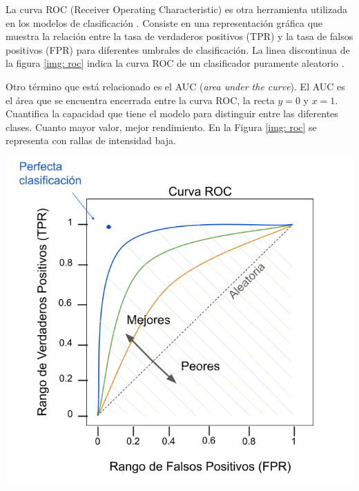 \begin{minipage}{0.5\textwidth}
La curva ROC (Receiver Operating Characteristic) es otra herramienta utilizada en los modelos de clasificación \citep{geron2022hands}. Consiste en una representación gráfica que muestra la relación entre la tasa de verdaderos positivos (TPR) y la tasa de falsos positivos (FPR) para diferentes umbrales de clasificación. La linea discontinua de la figura \ref{img: roc} indica la curva ROC de un clasificador puramente aleatorio \citep{geron2022hands}. 

\bigskip

Otro término que está relacionado es el AUC (\textit{area under the curve}). El AUC es el área que se encuentra encerrada entre la curva ROC, la recta $y = 0$ y $x = 1$. Cuantifica la capacidad que tiene el modelo para distinguir entre las diferentes clases. Cuanto mayor valor, mejor rendimiento. En la Figura \ref{img: roc} se representa con rallas de intensidad baja. 
\end{minipage}
\begin{minipage}{0.05\textwidth}
\textbf{ }
\end{minipage}
\begin{minipage}{0.4\textwidth}
	\includegraphics[width=1.15\textwidth]{img/roc.png}
	\label{img: roc}
\end{minipage}


